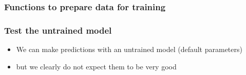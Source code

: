 \documentclass[letterpaper,10pt,english]{sphinxmanual}
\begin{document}
\subsubsection{Functions to prepare data for training}
\label{\detokenize{ML4NeutronImageSegmentation:functions-to-prepare-data-for-training}}
\begin{sphinxVerbatim}[commandchars=\\\{\}]
   
      


   
     \PYG{p}{[} \PYG{p}{]} 
\end{sphinxVerbatim}


\subsubsection{Test the untrained model}
\label{\detokenize{ML4NeutronImageSegmentation:test-the-untrained-model}}\begin{itemize}
\item {} 
We can make predictions with an untrained model (default parameters)

\item {} 
but we clearly do not expect them to be very good

\end{itemize}

\begin{sphinxVerbatim}[commandchars=\\\{\}]
  \PYG{p}{[}   \PYG{p}{]}
\end{sphinxVerbatim}
\end{document}

